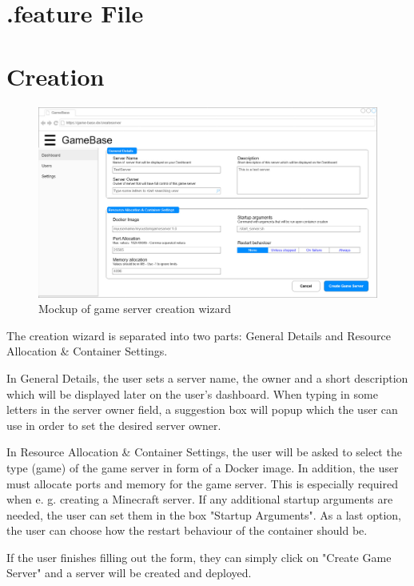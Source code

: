 \documentclass[a4paper,12pt,chapterprefix=false,bibliography=totoc,listof=totoc,book]{scrreprt}
\begin{document}
\section{.feature File}
\begin{minipage}{\textwidth}

\end{minipage}

\section{Creation}
\begin{figure}
	\includegraphics[width=\textwidth]{diagramms/UCCreateGameServerMockup.jpg}
	\caption{Mockup of game server creation wizard}
	\label{fig:mockup}
\end{figure}
The creation wizard is separated into two parts: General Details and Resource Allocation \& Container Settings.

In General Details, the user sets a server name, the owner and a short description which will be displayed later on the user's dashboard. When typing in some letters in the server owner field, a suggestion box will popup which the user can use in order to set the desired server owner.

In Resource Allocation \& Container Settings, the user will be asked to select the type (game) of the game server in form of a Docker image. In addition, the user must allocate ports and memory for the game server. This is especially required when e. g. creating a Minecraft server. If any additional startup arguments are needed, the user can set them in the box "Startup Arguments". As a last option, the user can choose how the restart behaviour of the container should be.

If the user finishes filling out the form, they can simply click on "Create Game Server" and a server will be created and deployed.
\end{document}
